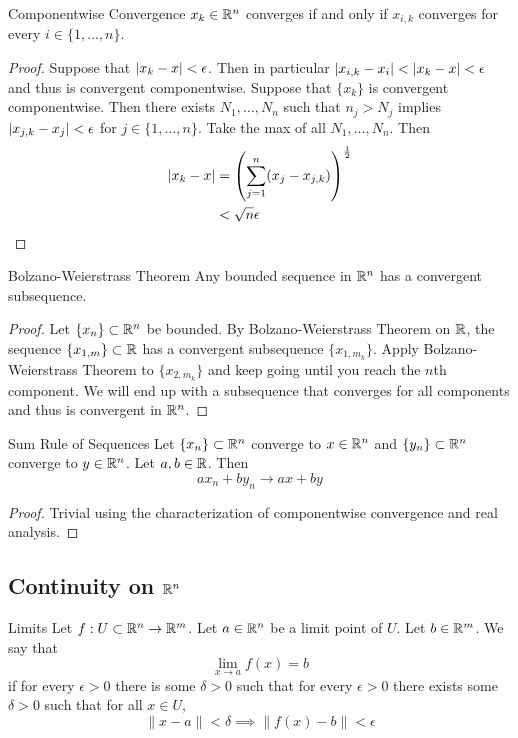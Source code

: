 \documentclass[a4paper]{article}
\begin{document}
\begin{prp}{Componentwise Convergence}{} $x _k\in\mathbb{R}^n$ converges if and only if $x _{i,k}$ converges for every $i\in\{1,\dots,n\}$. 
\begin{proof}
Suppose that $\abs{x _k-x }<\epsilon$. Then in particular $\abs{x _{i,k}-x _i}<\abs{x _k-x }<\epsilon$ and thus is convergent componentwise. Suppose that $\{x _k\}$ is convergent componentwise. Then there exists $N_1,\dots,N_n$ such that $n_j>N_j$ implies $\abs{x _{j,k}-x _j}<\epsilon$ for $j\in\{1,\dots,n\}$. Take the max of all $N_1,\dots,N_n$. Then 
\begin{align*}
\abs{x _k-x }&=\left(\sum_{j=1}^n(x _{j}-x _{j,k})\right)^{\frac{1}{2}}\\
&<\sqrt{n}\epsilon
\end{align*}
\end{proof}
\end{prp}

\begin{thm}{Bolzano-Weierstrass Theorem}{} Any bounded sequence in $\mathbb{R}^n$ has a convergent subsequence. 
\begin{proof} Let $\{x_n\}\subset\mathbb{R}^n$ be bounded. By Bolzano-Weierstrass Theorem on $\mathbb{R}$, the sequence $\{x_{1,m}\}\subset\mathbb{R}$ has a convergent subsequence $\{x_{1,m_k}\}$. Apply Bolzano-Weierstrass Theorem to $\{x_{2,m_k}\}$ and keep going until you reach the $n$th component. We will end up with a subsequence that converges for all components and thus is convergent in $\mathbb{R}^n$. 
\end{proof}
\end{thm}

\begin{prp}{Sum Rule of Sequences}{} Let $\{x_n\}\subset\mathbb{R}^n$ converge to $x\in\mathbb{R}^n$ and $\{y_n\}\subset\mathbb{R}^n$ converge to $y\in\mathbb{R}^n$. Let $a,b\in\mathbb{R}$. Then $$ax_n+by_n\to ax+by$$ 
\begin{proof}
Trivial using the characterization of componentwise convergence and real analysis. 
\end{proof}
\end{prp}

\subsection{Continuity on $\mathbb{R}^n$}
\begin{defn}{Limits}{} Let $f:U\subset\mathbb{R}^n\to\mathbb{R}^m$. Let $a\in\mathbb{R}^n$ be a limit point of $U$. Let $b\in\mathbb{R}^m$. We say that $$\lim_{x\to a}f(x)=b$$ if for every $\epsilon>0$ there is some $\delta>0$ such that for every $\epsilon>0$ there exists some $\delta>0$ such that for all $x\in U$, $$\|x-a\|<\delta\implies\|f(x)-b\|<\epsilon$$
\end{defn}
\end{document}
